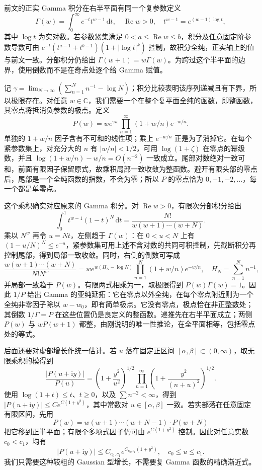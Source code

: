 \ProseParagraphBreak
前文的正实 Gamma 积分在右半平面有同一个复参数定义
\[
 \Gamma(w)=\int_0^\infty e^{-t}t^{w-1}\,\mathrm dt,
 \quad \operatorname{Re}w>0,
 \quad t^{w-1}=e^{(w-1)\log t},
\]
其中 \(\log t\) 为实对数。若参数紧集满足 \(0<a\leq\operatorname{Re}w\leq b\)，积分及任意固定阶参数导数可由 \(e^{-t}(t^{a-1}+t^{b-1})(1+|\log t|^k)\) 控制，故积分全纯，正实轴上的值与前文一致。分部积分仍给出 \(\Gamma(w+1)=w\Gamma(w)\)。为跨过这个半平面的边界，使用倒数而不是在奇点处逐个给 Gamma 赋值。

\ProseParagraphBreak
记 \(\gamma=\lim_{N\to\infty}(\sum_{n=1}^Nn^{-1}-\log N)\)；积分比较表明该序列递减且有下界，所以极限存在。对任意 \(w\in\mathbb C\)，我们需要一个在整个复平面全纯的函数，即整函数，其零点将抵消负参数的极点。定义
\[
 P(w)=w e^{\gamma w}
      \prod_{n=1}^\infty(1+w/n)e^{-w/n}.
\]
单独的 \(1+w/n\) 因子含有不可和的线性项；乘上 \(e^{-w/n}\) 正是为了消掉它。在每个紧参数集上，对充分大的 \(n\) 有 \(|w/n|<1/2\)，可用 \(\log(1+\zeta)\) 在零点的幂级数，并且
\(\log(1+w/n)-w/n=O(n^{-2})\) 一致成立。尾部对数绝对一致可和，前面有限因子保留原式，故乘积局部一致收敛为整函数。避开有限头部的零点后，尾部是一个全纯函数的指数，不会为零；所以 \(P\) 的零点恰为 \(0,-1,-2,\ldots\)，每一个都是单零点。

\ProseParagraphBreak
这个乘积确实对应原来的 Gamma 积分。对 \(\operatorname{Re}w>0\)，有限次分部积分给出
\[
 \int_0^1t^{w-1}(1-t)^N\,\mathrm dt
 =\frac{N!}{w(w+1)\cdots(w+N)}.
\]
乘以 \(N^w\) 再令 \(u=Nt\)，左侧趋于 \(\Gamma(w)\)：在 \(0<u<N\) 上有 \((1-u/N)^N\leq e^{-u}\)，紧参数集可用上述不含对数的共同可积控制，先截断积分再控制尾部，得到局部一致收敛。同时，右侧的倒数可写成
\[
 \frac{w(w+1)\cdots(w+N)}{N!N^w}
 =w e^{w(H_N-\log N)}
       \prod_{n=1}^N(1+w/n)e^{-w/n},
 \quad H_N=\sum_{n=1}^Nn^{-1},
\]
并局部一致趋于 \(P(w)\)。有限两式相乘为一，取极限得到 \(P(w)\Gamma(w)=1\)。因此 \(1/P\) 给出 Gamma 的亚纯延拓：它在零点以外全纯，在每个零点附近则为一个全纯非零因子除以 \(w-w_0\)，即有简单极点。它没有零点，极点恰在非正整数处；其倒数 \(1/\Gamma=P\) 在这些位置仍是良定义的整函数。递推先在右半平面成立；两侧 \(P(w)\) 与 \(wP(w+1)\) 都整，由刚说明的唯一性推论，在全平面相等，包括零点处的等式。

\ProseParagraphBreak
后面还要对虚部增长作统一估计。若 \(u\) 落在固定正区间 \([\alpha,\beta]\subset(0,\infty)\)，取无限乘积的模得到
\[
 \frac{|P(u+\mathrm iy)|}{P(u)}
 =\left(1+\frac{y^2}{u^2}\right)^{1/2}
 \prod_{n=1}^{\infty}
 \left(1+\frac{y^2}{(n+u)^2}\right)^{1/2}.
\]
使用 \(\log(1+t)\leq t\)、\(t\geq0\)，以及 \(\sum n^{-2}<\infty\)，得到 \(|P(u+\mathrm iy)|\leq C e^{C(1+y^2)}\)，其中常数对 \(u\in[\alpha,\beta]\) 一致。若实部落在任意固定有限区间，先用
\[
 P(w)=w(w+1)\cdots(w+N-1)\cdot P(w+N)
\]
把它移到正半平面；有限个多项式因子仍可由 \(e^{C(1+y^2)}\) 控制。因此对任意实数 \(c_0<c_1\)，均有
\[
 |P(u+\mathrm iy)|\leq C_{c_0,c_1}e^{C_{c_0,c_1}(1+y^2)},
 \quad c_0\leq u\leq c_1.
\]
我们只需要这种较粗的 Gaussian 型增长，不需要复 Gamma 函数的精确渐近式。

